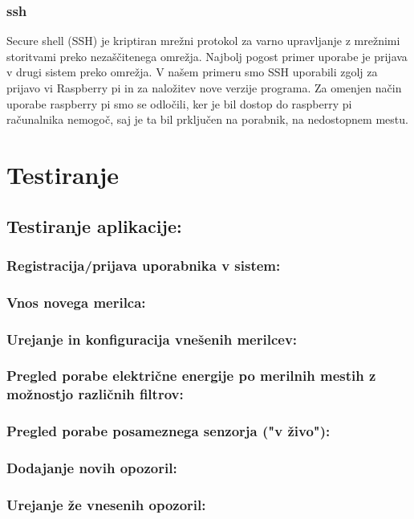 \documentclass[12pt,a4paper,titlepage,openany]{report}
\begin{document}
\subsection{ssh}
Secure shell (SSH) je kriptiran mrežni protokol za varno upravljanje z mrežnimi storitvami preko nezaščitenega omrežja. Najbolj pogost primer uporabe je prijava v drugi sistem preko omrežja.
V našem primeru smo SSH uporabili zgolj za prijavo vi Raspberry pi in za naložitev nove verzije programa. Za omenjen način uporabe raspberry pi smo se odločili, ker je bil dostop do raspberry pi računalnika nemogoč, saj je ta bil prključen na porabnik, na nedostopnem mestu.

\chapter{Testiranje}
\thispagestyle{fancy}


\section{Testiranje aplikacije:}
\thispagestyle{fancy}


\subsection{Registracija/prijava uporabnika v sistem:}
\subsection{Vnos novega merilca:}
\subsection{Urejanje in konfiguracija vnešenih merilcev:}
\subsection{Pregled porabe električne energije po merilnih mestih z možnostjo različnih filtrov:}
\subsection{Pregled porabe posameznega senzorja ("v živo"):}
\subsection{Dodajanje novih opozoril:}
\subsection{Urejanje že vnesenih opozoril:}
\end{document}
